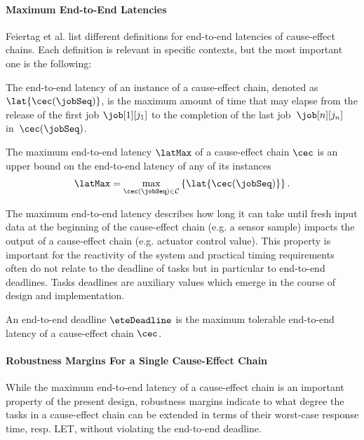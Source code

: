 \paragraph{Maximum End-to-End Latencies}
Feiertag et al. \cite{feiertag2009compositional} list different definitions for end-to-end latencies of cause-effect chains.  
Each definition is relevant in specific contexts, but the most important one is the following:
%
\begin{definition}
The end-to-end latency  of an instance of a cause-effect chain, denoted as $\lat{\cec(\jobSeq)}$, is the maximum amount of time that may elapse from the release of the first job $\job[1][j_1]$ to the completion of the last job~$\job[n][j_n]$ in~$\cec(\jobSeq)$.
\end{definition}
%
\begin{definition}
The maximum end-to-end latency $\latMax$ of a cause-effect chain $\cec$ is an upper bound on the end-to-end latency of any of its instances
\begin{align*}
	\latMax =
	\max_{\cec(\jobSeq) \in \mathcal{C}} 
	\left\{ 
	\lat{\cec(\jobSeq)} 
	\right\}.
\end{align*}
\end{definition}

The maximum end-to-end latency describes how long it can take until fresh input data at the beginning of the cause-effect chain (e.g. a sensor sample) impacts the output of a cause-effect chain (e.g. actuator control value).
This property is important for the reactivity of the system and practical timing requirements often do not  relate to the deadline of tasks but in particular to end-to-end deadlines. 
Tasks deadlines are auxiliary values which emerge in the course of design and implementation.
%
\begin{definition}
An end-to-end deadline $\eteDeadline$ is the maximum tolerable end-to-end latency of a cause-effect chain $\cec$.
\end{definition}
%


\paragraph{Robustness Margins For a Single Cause-Effect Chain}
While the maximum end-to-end latency of a cause-effect chain is an important property of the present design, robustness margins indicate to what degree the tasks in a cause-effect chain can be extended in terms of their worst-case response time, resp. LET, without violating the end-to-end deadline. 
\bigskip

